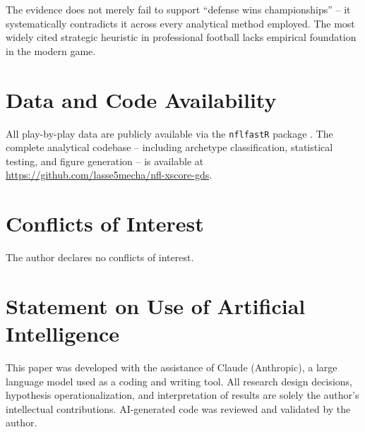 \documentclass[12pt,a4paper]{article}
\begin{document}
The evidence does not merely fail to support ``defense wins championships'' -- it systematically contradicts it across every analytical method employed. The most widely cited strategic heuristic in professional football lacks empirical foundation in the modern game.

\section*{Data and Code Availability}

All play-by-play data are publicly available via the \texttt{nflfastR} package \citep{carl2021nflfastr}. The complete analytical codebase -- including archetype classification, statistical testing, and figure generation -- is available at \url{https://github.com/lasse5mecha/nfl-xscore-gds}.

\section*{Conflicts of Interest}

The author declares no conflicts of interest.

\section*{Statement on Use of Artificial Intelligence}

This paper was developed with the assistance of Claude (Anthropic), a large language model used as a coding and writing tool. All research design decisions, hypothesis operationalization, and interpretation of results are solely the author's intellectual contributions. AI-generated code was reviewed and validated by the author.

\printbibliography
\end{document}
